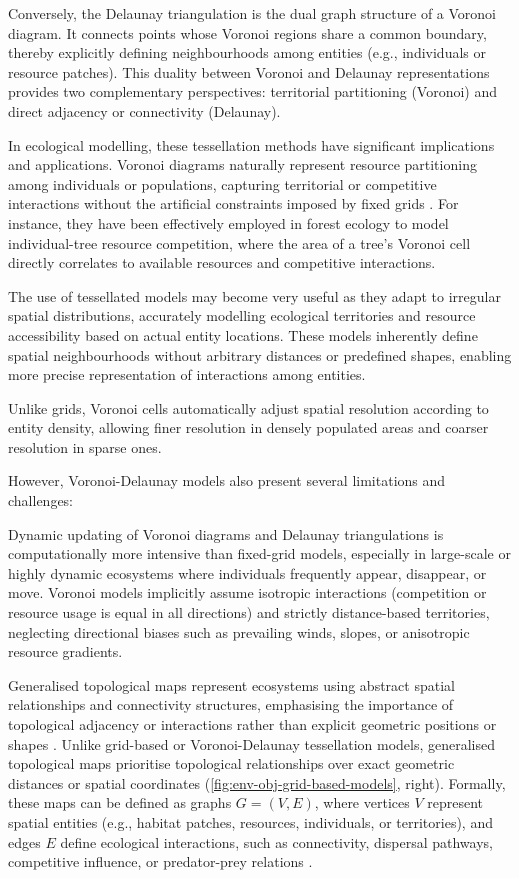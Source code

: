 Conversely, the Delaunay triangulation is the dual graph structure of a Voronoi diagram. It connects points whose Voronoi regions share a common boundary, thereby explicitly defining neighbourhoods among entities (e.g., individuals or resource patches). This duality between Voronoi and Delaunay representations provides two complementary perspectives: territorial partitioning (Voronoi) and direct adjacency or connectivity (Delaunay).

In ecological modelling, these tessellation methods have significant implications and applications. Voronoi diagrams naturally represent resource partitioning among individuals or populations, capturing territorial or competitive interactions without the artificial constraints imposed by fixed grids \cite{Castle2006}. For instance, they have been effectively employed in forest ecology to model individual-tree resource competition, where the area of a tree's Voronoi cell directly correlates to available resources and competitive interactions.

The use of tessellated models may become very useful as they adapt to irregular spatial distributions, accurately modelling ecological territories and resource accessibility based on actual entity locations. These models inherently define spatial neighbourhoods without arbitrary distances or predefined shapes, enabling more precise representation of interactions among entities.

Unlike grids, Voronoi cells automatically adjust spatial resolution according to entity density, allowing finer resolution in densely populated areas and coarser resolution in sparse ones.

However, Voronoi-Delaunay models also present several limitations and challenges:
\begin{Itemize}
    \Item{} Dynamic updating of Voronoi diagrams and Delaunay triangulations is computationally more intensive than fixed-grid models, especially in large-scale or highly dynamic ecosystems where individuals frequently appear, disappear, or move.
    \Item{} Voronoi models implicitly assume isotropic interactions (competition or resource usage is equal in all directions) and strictly distance-based territories, neglecting directional biases such as prevailing winds, slopes, or anisotropic resource gradients.
\end{Itemize}


Generalised topological maps represent ecosystems using abstract spatial relationships and connectivity structures, emphasising the importance of topological adjacency or interactions rather than explicit geometric positions or shapes \cite{Urban2009}. Unlike grid-based or Voronoi-Delaunay tessellation models, generalised topological maps prioritise topological relationships over exact geometric distances or spatial coordinates (\cref{fig:env-obj-grid-based-models}, right). Formally, these maps can be defined as graphs $G = (V, E)$, where vertices $V$ represent spatial entities (e.g., habitat patches, resources, individuals, or territories), and edges $E$ define ecological interactions, such as connectivity, dispersal pathways, competitive influence, or predator-prey relations \cite{Hamonic2021,Minor2008,Peterson2024}.

